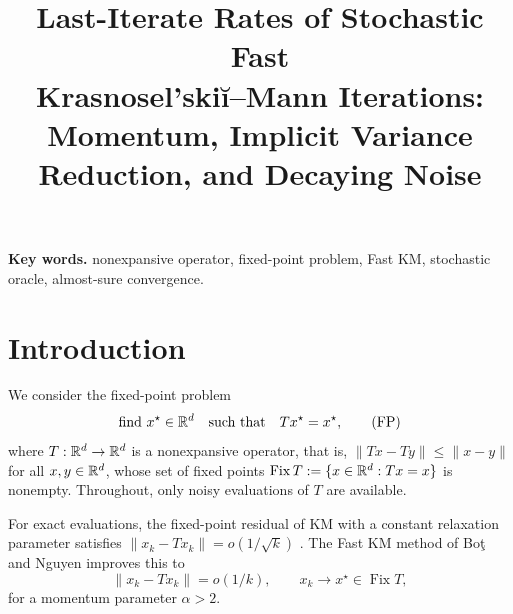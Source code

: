 \documentclass[10pt,draft]{article}
\title{Last-Iterate Rates of Stochastic Fast\\
Krasnosel'ski\u{i}--Mann Iterations:\\
Momentum, Implicit Variance Reduction, and Decaying Noise}
\author{}
\date{}
\numberwithin{equation}{section}
\theoremstyle{definition}
\theoremstyle{remark}
\newcommand{\HH}{\RR^d}
\DeclareMathOperator{\Fix}{Fix}
\newcommand{\norm}[1]{\lVert #1\rVert}
\begin{document}
\maketitle
\linenumbers

\begin{abstract}


\end{abstract}

\noindent\textbf{Key words.} nonexpansive operator, fixed-point problem,
Fast KM, stochastic oracle, almost-sure convergence.

\section{Introduction}\label{sec:introduction}

We consider the fixed-point problem
\begin{equation}\label{eq:problem}
 \text{find }x^\star\in\HH\quad\text{such that}\quad Tx^\star=x^\star,
 \tag{FP}
\end{equation}
where $T:\HH\to\HH$ is a nonexpansive operator, that is,
$\norm{Tx-Ty}\leq\norm{x-y}$ for all $x,y\in\HH$, whose set of fixed points
$\Fix T:=\{x\in\HH:Tx=x\}$ is nonempty. Throughout, only noisy evaluations
of $T$ are available.

For exact evaluations, the fixed-point residual of KM with a constant
relaxation parameter satisfies $\norm{x_k-Tx_k}=o(1/\sqrt{k})$
\cite{bot2023fast}. The Fast KM method of Bo\c{t} and Nguyen
\cite[Algorithm~2.1]{bot2023fast} improves this to
\begin{equation}\label{eq:intro-fast-km-rate}
 \norm{x_k-Tx_k}=o(1/k),\qquad x_k\to x^\star\in\Fix T,
\end{equation}
for a momentum parameter $\alpha>2$. 
\end{document}
